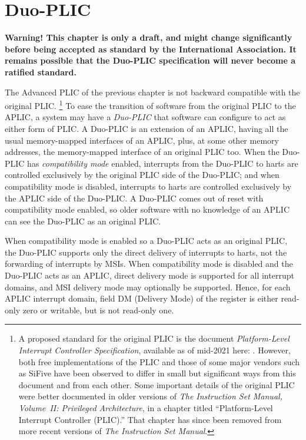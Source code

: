 
\chapter{Duo-PLIC}
\label{ch:DuoPLIC}

\textbf{%
Warning!
This chapter is only a draft, and might change significantly before 
being accepted as standard by the {\RISCV} International Association.
It remains possible that the Duo-PLIC specification
will never become a ratified standard.%
}
\bigskip

The Advanced PLIC of the previous chapter is not backward compatible
with the original {\RISCV} PLIC.%
\footnote{%
A proposed standard for the original PLIC is the document
\textit{{\RISCV} Platform-Level Interrupt Controller Specification},
available as of mid-2021 here:
.
However, both free implementations of the PLIC and those of some major
{\RISCV} vendors such as SiFive have been observed to differ in small
but significant ways from this document and from each other.
Some important details of the original PLIC were better documented in
older versions of
\textit{The {\RISCV} Instruction Set Manual, Volume~II: Privileged
Architecture}, in a chapter titled
``Platform-Level Interrupt Controller (PLIC).''
That chapter has since been removed from more recent versions of
\textit{The {\RISCV} Instruction Set Manual}.%
}
To ease the transition of software from the original PLIC to the
APLIC, a {\RISCV} system may have a \emph{\mbox{Duo-PLIC\/}}
that software can configure to act as either form of PLIC.
A \mbox{Duo-PLIC} is an extension of an APLIC, having all the
usual memory-mapped interfaces of an APLIC, plus, at some other
memory addresses, the memory-mapped interface of an original {\RISCV}
PLIC too.
When the \mbox{Duo-PLIC} has \emph{compatibility mode} enabled,
interrupts from the \mbox{Duo-PLIC} to harts are controlled exclusively
by the original PLIC side of the \mbox{Duo-PLIC};
and when compatibility mode is disabled, interrupts to harts
are controlled exclusively by the APLIC side of the
\mbox{Duo-PLIC}.
A \mbox{Duo-PLIC} comes out of reset with compatibility mode enabled,
so older software with no knowledge of an APLIC can see the
\mbox{Duo-PLIC} as an original PLIC.

When compatibility mode is enabled so a \mbox{Duo-PLIC} acts as an
original PLIC, the \mbox{Duo-PLIC} supports only the direct delivery of
interrupts to harts, not the forwarding of interrupts by MSIs.
When compatibility mode is disabled and the \mbox{Duo-PLIC} acts as
an APLIC, direct delivery mode is supported for all interrupt
domains, and MSI delivery mode may optionally be supported.
Hence, for each APLIC interrupt domain, field DM
(Delivery Mode) of the  register is either read-only zero
or writable, but is not read-only one.

